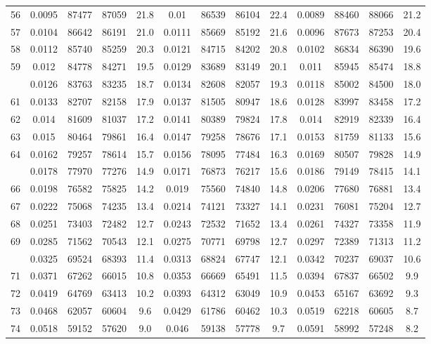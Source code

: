 \documentclass[
  14pt,
]{article}
\begin{document}
\begin{longtable}[t]{lcccccccccccc}
56 & 0.0095 & 87477 & 87059 & 21.8 & 0.01 & 86539 & 86104 & 22.4 & 0.0089 & 88460 & 88066 & 21.2\\
57 & 0.0104 & 86642 & 86191 & 21.0 & 0.0111 & 85669 & 85192 & 21.6 & 0.0096 & 87673 & 87253 & 20.4\\
58 & 0.0112 & 85740 & 85259 & 20.3 & 0.0121 & 84715 & 84202 & 20.8 & 0.0102 & 86834 & 86390 & 19.6\\
59 & 0.012 & 84778 & 84271 & 19.5 & 0.0129 & 83689 & 83149 & 20.1 & 0.011 & 85945 & 85474 & 18.8\\
\addlinespace
60 & 0.0126 & 83763 & 83235 & 18.7 & 0.0134 & 82608 & 82057 & 19.3 & 0.0118 & 85002 & 84500 & 18.0\\
61 & 0.0133 & 82707 & 82158 & 17.9 & 0.0137 & 81505 & 80947 & 18.6 & 0.0128 & 83997 & 83458 & 17.2\\
62 & 0.014 & 81609 & 81037 & 17.2 & 0.0141 & 80389 & 79824 & 17.8 & 0.014 & 82919 & 82339 & 16.4\\
63 & 0.015 & 80464 & 79861 & 16.4 & 0.0147 & 79258 & 78676 & 17.1 & 0.0153 & 81759 & 81133 & 15.6\\
64 & 0.0162 & 79257 & 78614 & 15.7 & 0.0156 & 78095 & 77484 & 16.3 & 0.0169 & 80507 & 79828 & 14.9\\
\addlinespace
65 & 0.0178 & 77970 & 77276 & 14.9 & 0.0171 & 76873 & 76217 & 15.6 & 0.0186 & 79149 & 78415 & 14.1\\
66 & 0.0198 & 76582 & 75825 & 14.2 & 0.019 & 75560 & 74840 & 14.8 & 0.0206 & 77680 & 76881 & 13.4\\
67 & 0.0222 & 75068 & 74235 & 13.4 & 0.0214 & 74121 & 73327 & 14.1 & 0.0231 & 76081 & 75204 & 12.7\\
68 & 0.0251 & 73403 & 72482 & 12.7 & 0.0243 & 72532 & 71652 & 13.4 & 0.0261 & 74327 & 73358 & 11.9\\
69 & 0.0285 & 71562 & 70543 & 12.1 & 0.0275 & 70771 & 69798 & 12.7 & 0.0297 & 72389 & 71313 & 11.2\\
\addlinespace
70 & 0.0325 & 69524 & 68393 & 11.4 & 0.0313 & 68824 & 67747 & 12.1 & 0.0342 & 70237 & 69037 & 10.6\\
71 & 0.0371 & 67262 & 66015 & 10.8 & 0.0353 & 66669 & 65491 & 11.5 & 0.0394 & 67837 & 66502 & 9.9\\
72 & 0.0419 & 64769 & 63413 & 10.2 & 0.0393 & 64312 & 63049 & 10.9 & 0.0453 & 65167 & 63692 & 9.3\\
73 & 0.0468 & 62057 & 60604 & 9.6 & 0.0429 & 61786 & 60462 & 10.3 & 0.0519 & 62218 & 60605 & 8.7\\
74 & 0.0518 & 59152 & 57620 & 9.0 & 0.046 & 59138 & 57778 & 9.7 & 0.0591 & 58992 & 57248 & 8.2\\

\end{longtable}
\end{document}
